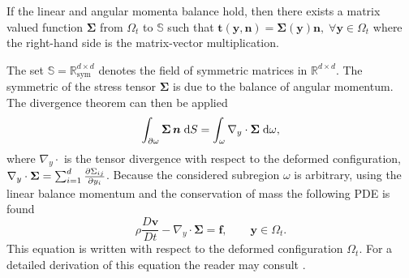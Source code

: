 \begin{theorem}
If the linear and angular momenta balance hold, then there exists a matrix valued function $\bm{\Sigma}$ from $\Omega_t$ to $\mathbb{S}$ such
that $\bm{t}(\bm{y}, \bm{n}) = \bm{\Sigma}(\bm{y}) \bm{n}, \; \forall \bm{y} \in \Omega_t$ where the right-hand side is the matrix-vector multiplication.
\end{theorem}
The set $\mathbb{S}=\mathbb{R}^{d\times d}_{\mathrm{sym}}$ denotes the field of symmetric matrices in $\mathbb{R}^{d\times d}$. The symmetric of the stress tensor $\bm{\Sigma}$ is due to the balance of angular momentum. The divergence theorem can then be applied
\begin{equation*}
\int_{\partial \omega} \bm{\Sigma} \, \bm{n} \d{S} = \int_{\omega} \nabla_y \cdot\bm{\Sigma} \d{\omega},
\end{equation*}
where $\nabla_y \cdot$ is the tensor divergence with respect to the deformed configuration, $\nabla_y \cdot\bm{\Sigma} = \sum_{i=1}^{d}\diffp{\Sigma_{ij}}{y_i}$.
Because the considered subregion $\omega$ is arbitrary, using the linear balance momentum and the conservation of mass the following PDE is found
\begin{equation*}
	\rho \frac{D\bm{v}}{Dt} - \nabla_y \cdot{\bm{\Sigma}} = \bm{f}, \qquad \bm{y} \in \Omega_t.
\end{equation*}
This equation is written with respect to the deformed configuration $\Omega_t$. For a detailed derivation of this equation the reader may consult \cite[Chapter 4]{abeyaratne2012notes}.

